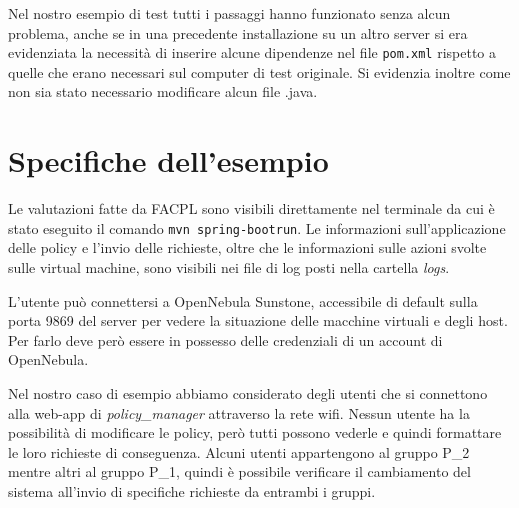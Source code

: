 Nel nostro esempio di test tutti i passaggi hanno funzionato senza alcun problema, anche se in una precedente installazione su un altro server si era evidenziata la necessità di inserire alcune dipendenze nel file \texttt{pom.xml} rispetto a quelle che erano necessari sul computer di test originale. Si evidenzia inoltre come non sia stato necessario modificare alcun file .java.

\section{Specifiche dell'esempio}
Le valutazioni fatte da FACPL sono visibili direttamente nel terminale da cui è stato eseguito il comando \texttt{mvn spring-boot\:run}. Le informazioni sull'applicazione delle policy e l'invio delle richieste, oltre che le informazioni sulle azioni svolte sulle virtual machine, sono visibili nei file di log posti nella cartella \emph{logs}.\par
L'utente può connettersi a OpenNebula Sunstone, accessibile di default sulla porta 9869 del server per vedere la situazione delle macchine virtuali e degli host. Per farlo deve però essere in possesso delle credenziali di un account di OpenNebula.\par
Nel nostro caso di esempio abbiamo considerato degli utenti che si connettono alla web-app di \emph{policy\_manager} attraverso la rete wifi. Nessun utente ha la possibilità di modificare le policy, però tutti possono vederle e quindi formattare le loro richieste di conseguenza. Alcuni utenti appartengono al gruppo P\_2 mentre altri al gruppo P\_1, quindi è possibile verificare il cambiamento del sistema all'invio di specifiche richieste da entrambi i gruppi.

